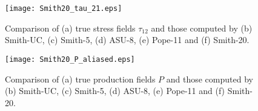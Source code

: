 




%
\begin{figure}
	\begin{center} \hspace{1.75cm}
	\texttt{[image: Smith20\_tau\_21.eps]}
	\caption{Comparison of (a) true stress fields $\tau_{12}$ and those computed by (b) Smith-UC, (c) Smith-5, (d) ASU-8, (e) Pope-11 and (f) Smith-20.}
	\label{F:Smith20_tau}
	\end{center}
\end{figure}
%
%



%
\begin{figure}
	\begin{center} \hspace{1.75cm}
	\texttt{[image: Smith20\_P\_aliased.eps]}
	\caption{Comparison of (a) true production fields $P$ and those computed by (b) Smith-UC, (c) Smith-5, (d) ASU-8, (e) Pope-11 and (f) Smith-20.}
	\label{F:Smith20_P}
	\end{center}
\end{figure}
%
%






